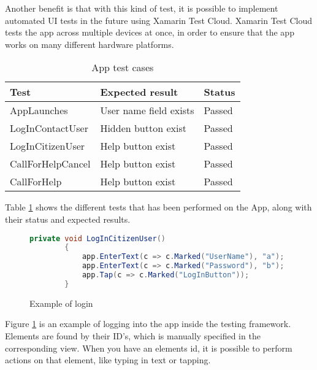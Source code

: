 Another benefit is that with this kind of test, it is possible to implement automated UI tests in the future using Xamarin Test Cloud. Xamarin Test Cloud tests the app across multiple devices at once, in order to ensure that the app works on many different hardware platforms. 

\begin{table}[h]
\centering

\begin{tabular}{|l|l|l|}
\hline
\textbf{Test}     & \textbf{Expected result} & \textbf{Status}               \\ \hline
AppLaunches       & User name field exists   & {\color[HTML]{009901} Passed} \\ \hline
LogInContactUser  & Hidden button exist      & {\color[HTML]{009901} Passed} \\ \hline
LogInCitizenUser  & Help button exist        & {\color[HTML]{009901} Passed} \\ \hline
CallForHelpCancel & Help button exist        & {\color[HTML]{009901} Passed} \\ \hline
CallForHelp       & Help button exist        & {\color[HTML]{009901} Passed} \\ \hline
\end{tabular}
\caption{App test cases}
\label{tab:app-test}
\end{table}

Table \ref{tab:app-test} shows the different tests that has been performed on the App, along with their status and expected results.

\begin{figure}[H]
    \centering
    \begin{lstlisting}[language=cs]
        private void LogInCitizenUser()
        {
            app.EnterText(c => c.Marked("UserName"), "a");
            app.EnterText(c => c.Marked("Password"), "b");
            app.Tap(c => c.Marked("LogInButton"));
        }
        \end{lstlisting}
    \caption{Example of login}
    \label{fig:test:loginFunction}
\end{figure}

Figure \ref{fig:test:loginFunction} is an example of logging into the app inside the testing framework. Elements are found by their ID's, which is manually specified in the corresponding view. When you have an elements id, it is possible to perform actions on that element, like typing in text or tapping.

